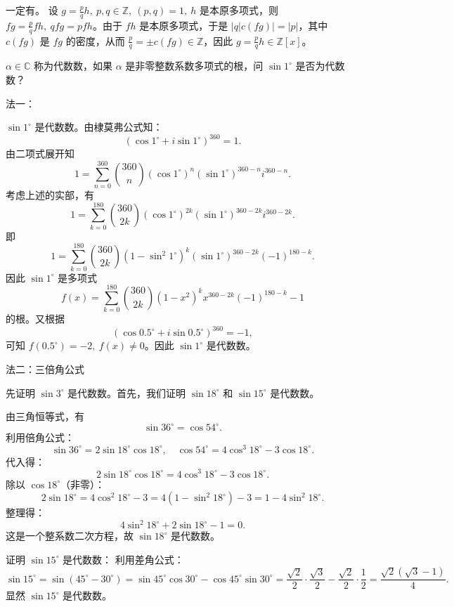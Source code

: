 \documentclass[lang=cn,12pt]{elegantbook}
\begin{document}
\begin{solution}
   一定有。  设 \( g = \frac{p}{q}h,\ p, q \in \mathbb{Z},\ (p, q) = 1,\ h \) 是本原多项式，则 \( fg = \frac{p}{q}fh,\ qfg = p fh \)。由于 \( fh \) 是本原多项式，于是 \( |q|c(fg)| = |p| \)，其中 \( c(fg) \) 是 \( fg \) 的密度，从而 \( \frac{p}{q} = \pm c(fg) \in \mathbb{Z} \)，因此 \( g = \frac{p}{q}h \in \mathbb{Z}[x] \)。
\end{solution}

\begin{example}
    \( \alpha \in \mathbb{C} \) 称为代数数，如果 \( \alpha \) 是非零整数系数多项式的根，问 \( \sin 1^\circ \) 是否为代数数？
\end{example} 

\begin{solution}
    法一： \par
     \( \sin 1^\circ \) 是代数数。由棣莫弗公式知：
    \[
    (\cos 1^\circ + i\sin 1^\circ)^{360} = 1.
    \]
    由二项式展开知
    \[
    1 = \sum_{n=0}^{360} \binom{360}{n} (\cos 1^\circ)^n (\sin 1^\circ)^{360-n} i^{360-n}.
    \]
    考虑上述的实部，有
    \[
    1 = \sum_{k=0}^{180} \binom{360}{2k} (\cos 1^\circ)^{2k} (\sin 1^\circ)^{360-2k} i^{360-2k}.
    \]
    即
    \[
    1 = \sum_{k=0}^{180} \binom{360}{2k} (1 - \sin^2 1^\circ)^k (\sin 1^\circ)^{360-2k} (-1)^{180-k}.
    \]
    因此 \( \sin 1^\circ \) 是多项式
    \[
    f(x) = \sum_{k=0}^{180} \binom{360}{2k} (1 - x^2)^k x^{360-2k} (-1)^{180-k} - 1
    \]
    的根。又根据
    \[
    (\cos 0.5^\circ + i\sin 0.5^\circ)^{360} = -1,
    \]
    可知 \( f(0.5^\circ) = -2,\ f(x) \neq 0 \)。因此 \( \sin 1^\circ \) 是代数数。 \par
    法二：三倍角公式 \par
    先证明 $\sin 3^\circ$ 是代数数。首先，我们证明 $\sin 18^\circ$ 和 $\sin 15^\circ$ 是代数数。

    由三角恒等式，有
    \[
    \sin 36^\circ = \cos 54^\circ.
    \]
    利用倍角公式：
    \[
    \sin 36^\circ = 2 \sin 18^\circ \cos 18^\circ, \quad \cos 54^\circ = 4 \cos^3 18^\circ - 3 \cos 18^\circ.
    \]
    代入得：
    \[
    2 \sin 18^\circ \cos 18^\circ = 4 \cos^3 18^\circ - 3 \cos 18^\circ.
    \]
    除以 $\cos 18^\circ$（非零）：
    \[
    2 \sin 18^\circ = 4 \cos^2 18^\circ - 3 = 4(1 - \sin^2 18^\circ) - 3 = 1 - 4 \sin^2 18^\circ.
    \]
    整理得：
    \[
    4 \sin^2 18^\circ + 2 \sin 18^\circ - 1 = 0.
    \]
    这是一个整系数二次方程，故 $\sin 18^\circ$ 是代数数。
    
    证明 $\sin 15^\circ$ 是代数数：
    利用差角公式：
    \[
    \sin 15^\circ = \sin(45^\circ - 30^\circ) = \sin 45^\circ \cos 30^\circ - \cos 45^\circ \sin 30^\circ = \frac{\sqrt{2}}{2} \cdot \frac{\sqrt{3}}{2} - \frac{\sqrt{2}}{2} \cdot \frac{1}{2} = \frac{\sqrt{2}(\sqrt{3} - 1)}{4}.
    \]
    显然 $\sin 15^\circ$ 是代数数。
    

\end{solution}
\end{document}
